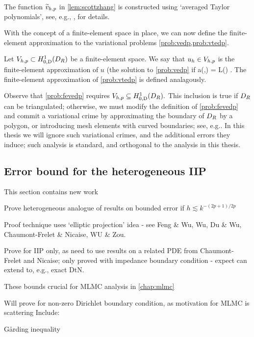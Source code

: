 The function $\widetilde{v}_{h,p}$ in \cref{lem:scottzhang} is constructed using `averaged Taylor polynomials', see, e.g., \cite{ScZh:90},\cite[Section 4.4]{BrSc:08} for details.
    \ere

    With the concept of a finite-element space in place, we can now define the finite-element approximation to the variational problems \cref{prob:vedp,prob:vtedp}.

    \label{prob:fevedp}
    Let $\Vhp \subset \HozDDR$ be a finite-element space. We say that $u_{h} \in V_{h,p}$ is the finite-element approximation of $u$ (the solution to \cref{prob:vedp} if
    \beqs
    a(\uh,\vh) = L(\vh) \tforall \vh \in \Vhp.
    The finite-element approximation of \cref{prob:vtedp} is defined analagously.
    \eeqs
    \eprob

    Observe that \cref{prob:fevedp} requires $\Vhp \subseteq \HozDDR.$ This inclusion is true if $D_{R}$ can be triangulated; otherwise, we must modify the definition of \cref{prob:fevedp} and commit a variational crime by approximating the boundary of $D_{R}$ by a polygon, or introducing mesh elements with curved boundaries; see, e.g.. In this thesis we will ignore such variational crimes, and the additional errors they induce; such analysis is standard, and orthogonal to the analysis in this thesis.
    \ere
    

\subsection{Error bound for the heterogeneous IIP}\label{sec:errbound}
\bit
\item This section contains new work
\item Prove heterogeneous analogue of results on bounded error if $h \lesssim k^{-(2p+1)/2p}$
\item Proof technique uses `elliptic projection' idea - see Feng \& Wu, Wu, Du \& Wu, Chaumont-Frelet \& Nicaise, WU \& Zou.
\item Prove for IIP only, as need to use results on a related PDE from Chaumont-Frelet and Nicaise; only proved with impedance boundary condition - expect can extend to, e.g., exact DtN.
\item These bounds crucial for MLMC analysis in \cref{chap:mlmc}
\item Will prove for non-zero Dirichlet boundary condition, as motivation for MLMC is scattering
  \eit
  Include:
  \bit
\item G\r{a}rding inequality
  \eit

